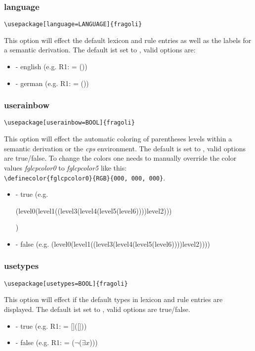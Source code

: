 \documentclass[10pt, a4paper]{article}
\newenvironment{itemizeexample}{
	\begin{itemize}
		\setlength\itemsep{-.5em}
	}
	{
	\end{itemize}
}
\begin{document}
	\subsubsection{language}
	\begin{lstlisting}[style=A]
			\usepackage[language=LANGUAGE]{fragoli}
	\end{lstlisting}
	This option will effect the default lexicon and rule entries as well as the labels for a semantic derivation. The default ist set to \texttt{}, valid options are:
	\begin{itemizeexample}
		\item[-] english (e.g. R1:  = (\lambheN{}))
		\item[-] german (e.g. R1:  = (\lambheN{}))
	\end{itemizeexample}
	\subsubsection{userainbow}
	\begin{lstlisting}[style=A]
			\usepackage[userainbow=BOOL]{fragoli}
	\end{lstlisting}
	This option will effect the automatic coloring of parentheses levels within a semantic derivation or the \textit{cps} environment. The default is set to \texttt{}, valid options are true/false. To change the colors one needs to manually override the color values \textit{fglcpcolor0} to \textit{fglcpcolor5} like this: \\\verb=\definecolor{fglcpcolor0}{RGB}{000, 000, 000}=.
	\begin{itemizeexample}
		\item[-] true (e.g. \begin{cps}(level0(level1((level3(level4(level5(level6))))level2)))\end{cps})
		\item[-] false (e.g. (level0(level1((level3(level4(level5(level6))))level2))))
	\end{itemizeexample}
	\subsubsection{usetypes}
	\begin{lstlisting}[style=A]
			\usepackage[usetypes=BOOL]{fragoli}
	\end{lstlisting}
	This option will effect if the default types in lexicon and rule entries are displayed. The default ist set to \texttt{}, valid options are true/false.
	\begin{itemizeexample}
		\item[-] true (e.g. R1:  = []([]\lambhen[x][\type{e}]))
		\item[-] false (e.g. R1:  = ($\neg$($\exists$$x$)))
	\end{itemizeexample}
\end{document}
